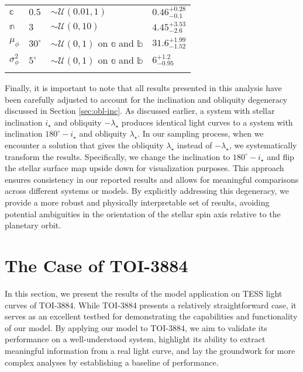 \documentclass[twocolumn]{aastex631}
\begin{document}
\begin{table}[]
\begin{tabular}{llll}
    $\mathbb{c}$                              & $0.5$                 & $\sim\mathcal{U}(0.01, 1)$           & $0.46^{+0.28}_{-0.1}$                               \\
    $\mathbb{n}$                              & $3$                   & $\sim\mathcal{U}(0, 10)$             & $4.45^{+3.53}_{-2.6}$                               \\
    $\mu_\phi$                                & $30^\circ$            & $\sim\mathcal{U}(0, 1)$ on $\mathbb{a}$ and $\mathbb{b}$ & $31.6^{+1.99}_{-1.52}$                               \\
    $\sigma^2_\phi$                           & $5^\circ$             & $\sim\mathcal{U}(0, 1)$ on $\mathbb{a}$ and $\mathbb{b}$ & $6^{+1.2}_{-0.95}$                      \\ \hline
    \label{tab:LongPriors}
    \end{tabular}
\end{table}
%

Finally, it is important to note that all results presented in this analysis have been carefully adjusted to account for the inclination and obliquity 
degeneracy discussed in Section \ref{sec:obl-inc}. As discussed earlier, a system with stellar inclination $i_\star$ and obliquity $-\lambda_\star$ 
produces identical light curves to a system with inclination $180^\circ-i_\star$ and obliquity $\lambda_\star$. In our sampling process, 
when we encounter a solution that gives the obliquity $\lambda_\star$ instead of $-\lambda_\star$, we systematically transform the results. 
Specifically, we change the inclination to $180^\circ-i_\star$ and flip the stellar surface map upside down for visualization purposes. 
This approach ensures consistency in our reported results and allows for meaningful comparisons across different systems or models. 
By explicitly addressing this degeneracy, we provide a more robust and physically interpretable set of results, avoiding potential ambiguities in the 
orientation of the stellar spin axis relative to the planetary orbit.


\section{The Case of TOI-3884}
\label{sec:toi3884}
In this section, we present the results of the model application on TESS light curves of TOI-3884. While TOI-3884 presents a relatively straightforward case, 
it serves as an excellent testbed for demonstrating the capabilities and functionality of our model. By applying our model to TOI-3884, we aim to validate 
its performance on a well-understood system, highlight its ability to extract meaningful information from a real light curve, 
and lay the groundwork for more complex analyses by establishing a baseline of performance.
\end{document}
